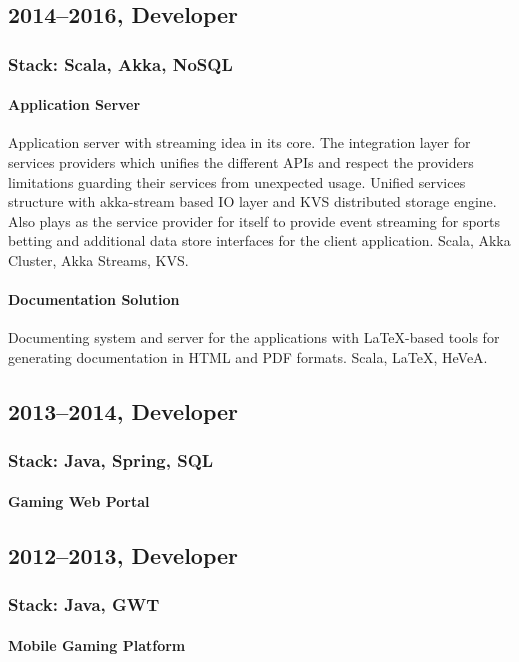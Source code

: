 \subsection*{2014–2016, Developer}
\subsubsection*{Stack: Scala, Akka, NoSQL}

\paragraph{Application Server}
Application server with streaming idea in its core. The integration layer for services providers which unifies the different APIs and respect the providers limitations guarding their services from unexpected usage. Unified services structure with akka-stream based IO layer and KVS distributed storage engine. Also plays as the service provider for itself to provide event streaming for sports betting and additional data store interfaces for the client application.
Scala, Akka Cluster, Akka Streams, KVS.

\paragraph{Documentation Solution}
Documenting system and server for the applications with LaTeX-based tools for generating documentation in HTML and PDF formats.
Scala, LaTeX, HeVeA.

\subsection*{2013–2014, Developer}
\subsubsection*{Stack: Java, Spring, SQL}
\paragraph{Gaming Web Portal}

\subsection*{2012–2013, Developer}
\subsubsection*{Stack: Java, GWT}
\paragraph{Mobile Gaming Platform}

